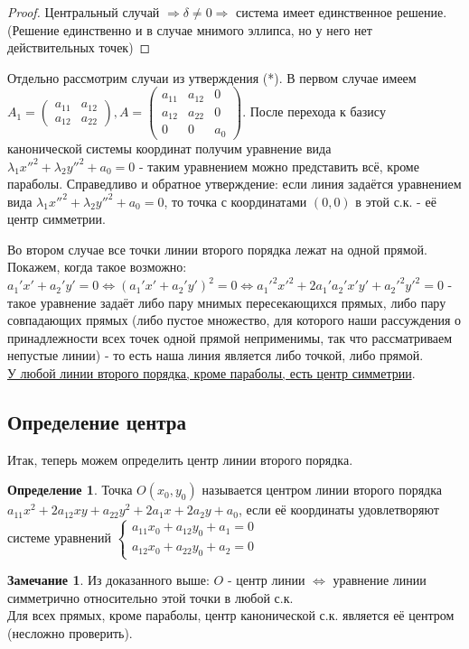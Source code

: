 \documentclass[a4paper, 12pt]{article}
\theoremstyle{definition}
\newtheorem*{definition}{Определение}
\newtheorem*{remark}{Замечание}
\begin{document}
	\begin{proof}
		Центральный случай $\Rightarrow \delta \neq 0 \Rightarrow$ система имеет единственное решение.\\
		(Решение единственно и в случае мнимого эллипса, но у него нет действительных точек) 
	\end{proof}
	Отдельно рассмотрим случаи из утверждения (*). В первом случае имеем $A_1 = \begin{pmatrix}a_{11}&a_{12}\\a_{12}&a_{22}\end{pmatrix}, A = \begin{pmatrix}a_{11}&a_{12}&0\\a_{12}&a_{22}&0\\ 0&0&a_{0}\end{pmatrix}$. После перехода к базису канонической системы координат получим уравнение вида $\lambda_1{x''}^2 + \lambda_2{y''}^2 + a_0 = 0$ - таким уравнением можно представить всё, кроме параболы. Справедливо и обратное утверждение: если линия задаётся уравнением вида $\lambda_1{x''}^2 + \lambda_2{y''}^2 + a_0 = 0$, то точка с координатами $(0, 0)$ в этой с.к. - её центр симметрии.

	Во втором случае все точки линии второго порядка лежат на одной прямой. Покажем, когда такое возможно: $a_1'x' + a_2'y' = 0 \Leftrightarrow (a_1'x' + a_2'y')^2 = 0 \Leftrightarrow {a_1'}^2{x'}^2 + 2a_1'a_2'x'y' + {a_2'}^2{y'}^2 = 0$ - такое уравнение задаёт либо пару мнимых пересекающихся прямых, либо пару совпадающих прямых (либо пустое множество, для которого наши рассуждения о принадлежности всех точек одной прямой неприменимы, так что рассматриваем непустые линии) - то есть наша линия является либо точкой, либо прямой.\\
	\underline{У любой линии второго порядка, кроме параболы, есть центр симметрии}.

	\subsection{Определение центра}
	Итак, теперь можем определить центр линии второго порядка.
	\begin{definition}
		Точка $O(x_0, y_0)$ называется центром линии второго порядка $a_{11}x^2 + 2a_{12}xy + a_{22}y^2 + 2a_{1}x + 2a_{2}y + a_{0}$, если её координаты удовлетворяют системе уравнений $\begin{cases}
			a_{11}x_0+a_{12}y_0+a_1=0\\
			a_{12}x_0+a_{22}y_0+a_2=0
		\end{cases}$
	\end{definition}
	\begin{remark}
		Из доказанного выше: $O$ - центр линии $\Leftrightarrow$ уравнение линии симметрично относительно этой точки в любой с.к.\\
		Для всех прямых, кроме параболы, центр канонической с.к. является её центром (несложно проверить).
	\end{remark}
\end{document}
